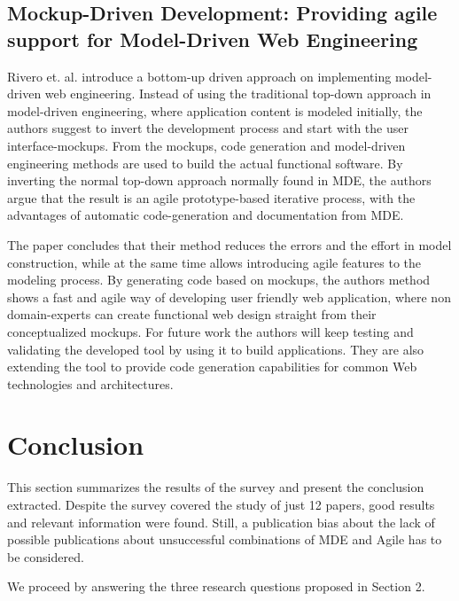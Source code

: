 \documentclass[10pt, a4paper, twocolumn]{article}
\begin{document}
\subsection{Mockup-Driven Development: Providing agile support for Model-Driven Web Engineering}

Rivero et. al. \cite{RIVERO2014670} introduce a bottom-up driven approach on implementing model-driven web engineering. Instead of using the traditional top-down approach in model-driven engineering, where application content is modeled initially, the authors suggest to invert the development process and start with the user interface-mockups. From the mockups, code generation and model-driven engineering methods are used to build the actual functional software. By inverting the normal top-down approach normally found in MDE, the authors argue that the result is an agile prototype-based iterative process, with the advantages of automatic code-generation and documentation from MDE. 

The paper concludes that their method reduces the errors and the effort in model construction, while at the same time allows introducing agile features to the modeling process. By generating code based on mockups, the authors method shows a fast and agile way of developing user friendly web application, where non domain-experts can create functional web design straight from their conceptualized mockups. For future work the authors will keep testing and validating the developed tool by using it to build applications. They are also extending the tool to provide code generation capabilities for common Web technologies and architectures.


\section{Conclusion}
\label{sec:conclusion}
This section summarizes the results of the survey and present the conclusion extracted.
Despite the survey covered the study of just 12 papers, good results and relevant information were found.
Still, a publication bias about the lack of possible publications about unsuccessful combinations of MDE and Agile has to be considered.

We proceed by answering the three research questions proposed in Section 2.
\end{document}
